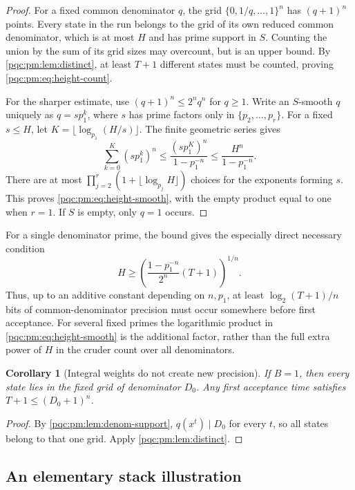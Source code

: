 \documentclass[11pt,letterpaper]{article}
\numberwithin{equation}{section}
\newtheorem{corollary}[theorem]{Corollary}
\theoremstyle{definition}
\theoremstyle{remark}
\begin{document}
\begin{proof}
For a fixed common denominator $q$, the grid
$\{0,1/q,\ldots,1\}^n$ has $(q+1)^n$ points. Every state in the run belongs
to the grid of its own reduced common denominator, which is at most $H$ and
has prime support in $S$. Counting the union by the sum of its grid sizes
may overcount, but is an upper bound. By \cref{pqc:pm:lem:distinct}, at least $T+1$
different states must be counted, proving \eqref{pqc:pm:eq:height-count}.

For the sharper estimate, use $(q+1)^n\leq2^nq^n$ for $q\geq1$. Write an
$S$-smooth $q$ uniquely as $q=s p_1^k$, where $s$ has prime factors only in
$\{p_2,\ldots,p_r\}$. For a fixed $s\leq H$, let
$K=\lfloor\log_{p_1}(H/s)\rfloor$. The finite geometric series gives
\[
 \sum_{k=0}^K(sp_1^k)^n
 \leq\frac{(sp_1^K)^n}{1-p_1^{-n}}
 \leq\frac{H^n}{1-p_1^{-n}}.
\]
There are at most
$\prod_{j=2}^r(1+\lfloor\log_{p_j}H\rfloor)$ choices for the exponents
forming $s$. This proves \eqref{pqc:pm:eq:height-smooth}, with the empty product
equal to one when $r=1$. If $S$ is empty, only $q=1$ occurs.
\end{proof}

For a single denominator prime, the bound gives the especially direct
necessary condition
\[
 H\geq\left(\frac{1-p_1^{-n}}{2^n}(T+1)\right)^{1/n}.
\]
Thus, up to an additive constant depending on $n,p_1$, at least
$\log_2(T+1)/n$ bits of common-denominator precision must occur somewhere
before first acceptance. For several fixed primes the logarithmic product
in \eqref{pqc:pm:eq:height-smooth} is the additional factor, rather than the full
extra power of $H$ in the cruder count over all denominators.

\begin{corollary}[Integral weights do not create new precision]
If $B=1$, then every state lies in the fixed grid of denominator $D_0$.
Any first acceptance time satisfies $T+1\leq(D_0+1)^n$.
\end{corollary}

\begin{proof}
By \cref{pqc:pm:lem:denom-support}, $q(x^t)\mid D_0$ for every $t$, so all states
belong to that one grid. Apply \cref{pqc:pm:lem:distinct}.
\end{proof}

\subsection{An elementary stack illustration}
\end{document}
